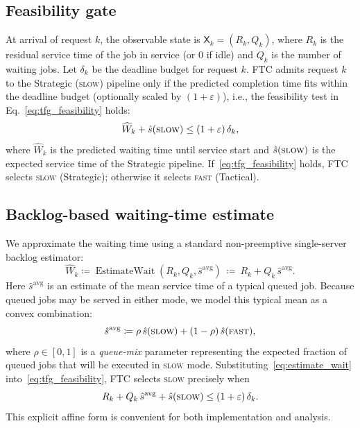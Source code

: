 \documentclass[preprint,12pt]{elsarticle}
\begin{document}
\subsection{Feasibility gate}
\label{sec:tfg_gate}

At arrival of request $k$, the observable state is $\mathsf{X}_k=(R_k,Q_k)$, where $R_k$ is the residual service time of the job in service (or $0$ if idle) and $Q_k$ is the number of waiting jobs. Let $\delta_k$ be the deadline budget for request $k$. FTC admits request $k$ to the Strategic (\textsc{slow}) pipeline only if the predicted completion time fits within the deadline budget (optionally scaled by $(1+\varepsilon)$), i.e., the feasibility test in Eq.~\eqref{eq:tfg_feasibility} holds:
\begin{equation}
\widehat{W}_k + \hat{s}(\textsc{slow}) \le (1+\varepsilon)\,\delta_k,
\label{eq:tfg_feasibility}
\end{equation}
where $\widehat{W}_k$ is the predicted waiting time until service start and $\hat{s}(\textsc{slow})$ is the expected service time of the Strategic pipeline. If~\eqref{eq:tfg_feasibility} holds, FTC selects \textsc{slow} (Strategic); otherwise it selects \textsc{fast} (Tactical).

\subsection{Backlog-based waiting-time estimate}
\label{sec:tfg_wait_est}

We approximate the waiting time using a standard non-preemptive single-server backlog estimator:
\begin{equation}
\widehat{W}_k \coloneqq \operatorname{EstimateWait}(R_k,Q_k,\hat{s}^{\mathrm{avg}})
\ \coloneqq\ R_k + Q_k\,\hat{s}^{\mathrm{avg}}.
\label{eq:estimate_wait}
\end{equation}
Here $\hat{s}^{\mathrm{avg}}$ is an estimate of the mean service time of a typical queued job. Because queued jobs may be served in either mode, we model this typical mean as a convex combination:
\begin{equation}
\hat{s}^{\mathrm{avg}} \coloneqq \rho\,\hat{s}(\textsc{slow}) + (1-\rho)\,\hat{s}(\textsc{fast}),
\label{eq:avg_service_mix}
\end{equation}
where $\rho\in[0,1]$ is a \emph{queue-mix} parameter representing the expected fraction of queued jobs that will be executed in \textsc{slow} mode. Substituting~\eqref{eq:estimate_wait} into~\eqref{eq:tfg_feasibility}, FTC selects \textsc{slow} precisely when
\begin{equation}
R_k + Q_k\,\hat{s}^{\mathrm{avg}} + \hat{s}(\textsc{slow}) \le (1+\varepsilon)\,\delta_k.
\label{eq:ftc_affine_rule}
\end{equation}
This explicit affine form is convenient for both implementation and analysis.
\end{document}
